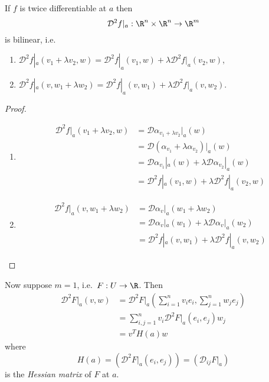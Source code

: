 \documentclass[a4paper]{article}
\newcommand*{\D}{\mathcal{D}}
\theoremstyle{definition}
\begin{document}
\begin{lemma}
  If \(f\) is twice differentiable at \(a\) then
  \[
    \D^2 f|_a: \R^n \times \R^n \to \R^m
  \]
  is bilinear, i.e.
  \begin{enumerate}
  \item \(\D^2 f|_a(v_1 + \lambda v_2, w) = \D^2 f|_a(v_1, w) + \lambda \D^2 f|_a(v_2, w)\),
  \item \(\D^2 f|_a(v, w_1 + \lambda w_2) = \D^2 f|_a(v, w_1) + \lambda \D^2 f|_a(v, w_2)\).
  \end{enumerate}
\end{lemma}

\begin{proof}\leavevmode
  \begin{enumerate}
  \item
    \begin{align*}
      \D^2 f|_a(v_1 + \lambda v_2, w) &= \D \alpha_{v_1 + \lambda v_2}|_a (w) \\
                                      &= \D(\alpha_{v_1} + \lambda\alpha_{v_2}) |_a (w) \\
                                      &= \D \alpha_{v_1} |_a (w) + \lambda \D \alpha_{v_2} |_a (w) \\
                                      &= \D^2 f|_a(v_1, w) + \lambda \D^2 f|_a(v_2, w)
    \end{align*}
  \item 
    \begin{align*}
      \D^2 f|_a(v, w_1 + \lambda w_2) &= \D \alpha_v|_a (w_1 + \lambda w_2) \\
                                      &= \D \alpha_v|_a(w_1) + \lambda \D \alpha_v|_a(w_2) \\
                                      &= \D^2 f|_a(v, w_1) + \lambda \D^2 f|_a(v, w_2)
    \end{align*}
  \end{enumerate}
\end{proof}

Now suppose \(m = 1\), i.e.\ \(F: U \to \R\). Then
\begin{align*}
  \D^2 F|_a (v, w) &= \D^2 F|_a \left( \sum_{i = 1}^{n} v_i e_i, \sum_{j = 1}^{n} w_j e_j \right) \\
                   &= \sum_{i, j = 1}^{n} v_i \D^2 F|_a(e_i, e_j) w_j \\
                   &= v^T H(a) w
\end{align*}
where
\[
  H(a) = (\D^2 F|_a (e_i, e_j)) = (\D_{ij} F|_a)
\]
is the \emph{Hessian matrix}  of \(F\) at \(a\).
\end{document}
